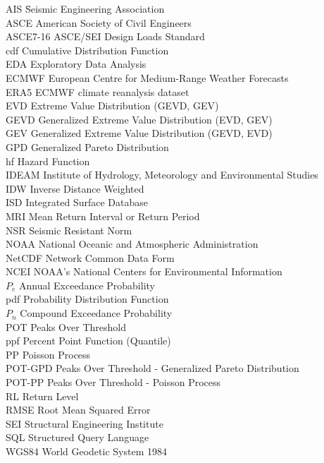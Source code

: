 \documentclass[12pt,oneside]{reedthesis}
\begin{document}
  \begin{dedication}
    \begin{tabbing}
    AIS \hspace{3em} \= Seismic Engineering Association  \\
    ASCE \> American Society of Civil Engineers \\
    ASCE7-16 \> ASCE/SEI Design Loads Standard \\
    cdf \>  Cumulative Distribution Function \\
    EDA \>  Exploratory Data Analysis \\
    ECMWF \>  European Centre for Medium-Range Weather Forecasts \\
    ERA5 \>  ECMWF climate reanalysis dataset  \\
    EVD \>  Extreme Value Distribution (GEVD, GEV)  \\
    GEVD \>  Generalized Extreme Value Distribution (EVD, GEV) \\
    GEV \>  Generalized Extreme Value Distribution (GEVD, EVD)  \\
    GPD \>  Generalized Pareto Distribution  \\
    hf \> Hazard Function \\
    IDEAM \> Institute of Hydrology, Meteorology and Environmental Studies \\
    IDW \>  Inverse Distance Weighted \\
    ISD \> Integrated Surface Database \\
    MRI \> Mean Return Interval or Return Period \\
    NSR \> Seismic Resistant Norm  \\
    NOAA \> National Oceanic and Atmospheric Administration \\
    NetCDF \> Network Common Data Form \\
    NCEI \> NOAA's National Centers for Environmental Information \\
    $P_e$ \> Annual Exceedance Probability \\
    pdf \> Probability Distribution Function  \\
    $P_n$ \>  Compound Exceedance Probability \\
    POT \> Peaks Over Threshold \\
    ppf \> Percent Point Function (Quantile) \\
    PP \> Poisson Process \\
    POT-GPD \> Peaks Over Threshold - Generalized Pareto Distribution \\
    POT-PP  \> Peaks Over Threshold - Poisson Process \\
    RL \> Return Level \\
    RMSE \> Root Mean Squared Error \\  
    SEI \> Structural Engineering Institute \\
    SQL \>  Structured Query Language \\
    WGS84 \> World Geodetic System 1984
    \end{tabbing}
  \end{dedication}
\mainmatter %
\pagestyle{fancyplain} %
\end{document}
